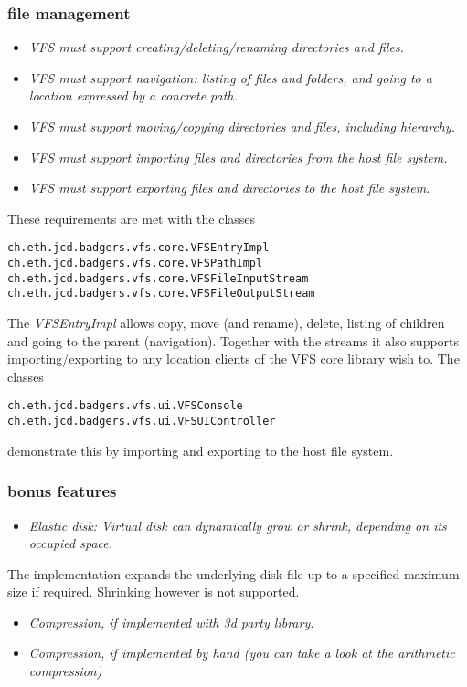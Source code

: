 \subsubsection{file management}
\begin{itemize}
  \item \emph{VFS must support creating/deleting/renaming directories and files.}
  \item \emph{VFS must support navigation: listing of files and folders, and
  going to a location expressed by a concrete path.}
  \item \emph{VFS must support moving/copying directories and files, including
  hierarchy.}
  \item \emph{VFS must support importing files and directories from
  the host file system.}
  \item \emph{VFS must support exporting files and directories to the host file
  system.}
\end{itemize} These requirements are met with the classes
\begin{verbatim}
ch.eth.jcd.badgers.vfs.core.VFSEntryImpl
ch.eth.jcd.badgers.vfs.core.VFSPathImpl
ch.eth.jcd.badgers.vfs.core.VFSFileInputStream
ch.eth.jcd.badgers.vfs.core.VFSFileOutputStream
\end{verbatim}The \textit{VFSEntryImpl} allows
copy, move (and rename), delete, listing of children and going to the parent
(navigation). Together with the streams it also supports importing/exporting
to any location clients of the VFS core library wish to. The classes
\begin{verbatim}
ch.eth.jcd.badgers.vfs.ui.VFSConsole
ch.eth.jcd.badgers.vfs.ui.VFSUIController
\end{verbatim} demonstrate this by importing and exporting to the host file
system.

\subsubsection {bonus features}
\begin{itemize}
  \item \emph{Elastic disk: Virtual disk can dynamically grow or shrink,
  depending on its occupied space.}
\end{itemize}
The implementation expands the underlying disk file up to a specified maximum size if required. Shrinking however is not supported.

\begin{itemize}
  \item \emph{Compression, if implemented with 3d party library.}
  \item \emph{Compression, if implemented by hand (you can take a look at
  the arithmetic compression)}
\end{itemize}

